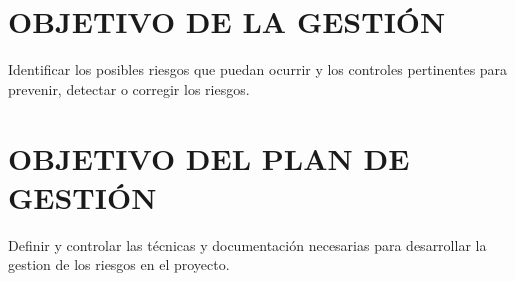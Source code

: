 \chapter{OBJETIVO DE LA GESTI\'ON}
Identificar los posibles riesgos que puedan ocurrir y los controles pertinentes para prevenir, detectar o 
corregir los riesgos.%

\chapter{OBJETIVO DEL PLAN DE GESTI\'ON}
Definir y controlar las t\'ecnicas y documentaci\'on necesarias para desarrollar la gestion de los riesgos en
el proyecto.%
